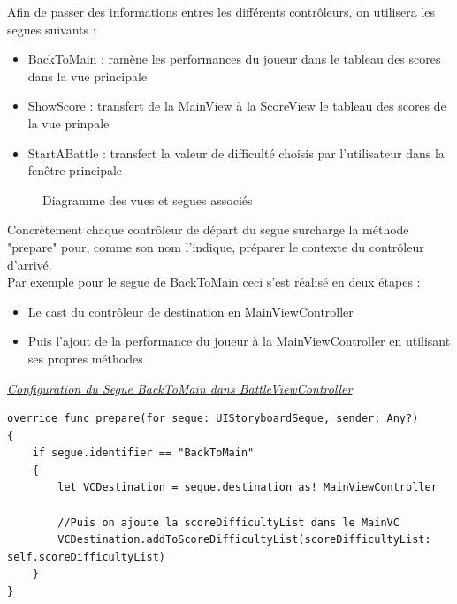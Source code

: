\documentclass{article}
\begin{document}
Afin de passer des informations entres les différents contrôleurs, on utilisera les segues suivants :
\begin{itemize}
    \item  BackToMain : ramène les performances du joueur dans le tableau des scores dans la vue principale
    \item  ShowScore : transfert de la MainView à la ScoreView le tableau des scores de la vue prinpale
    \item  StartABattle : transfert la valeur de difficulté choisis par l'utilisateur dans la fenêtre principale 
\end{itemize}

\begin{figure}[H]
    \centering
        \caption{Diagramme des vues et segues associés}
\end{figure}


Concrètement chaque contrôleur de départ du segue surcharge la méthode "prepare" pour, comme son nom l'indique, préparer le contexte du contrôleur d'arrivé.\\ 
Par exemple pour le segue de BackToMain ceci s'est réalisé en deux étapes : 
\begin{itemize}
    \item  Le cast du contrôleur de destination en MainViewController
    \item  Puis l'ajout de la performance du joueur à la MainViewController en utilisant ses propres méthodes \\
\end{itemize}
 
\noindent \underline{\textit{\cite{devLibreSegue}Configuration du Segue BackToMain dans BattleViewController}}
\begin{verbatim}
override func prepare(for segue: UIStoryboardSegue, sender: Any?) 
{
    if segue.identifier == "BackToMain"
    {
        let VCDestination = segue.destination as! MainViewController
                    
        //Puis on ajoute la scoreDifficultyList dans le MainVC
        VCDestination.addToScoreDifficultyList(scoreDifficultyList: self.scoreDifficultyList)
    }
}
\end{verbatim}
\end{document}
